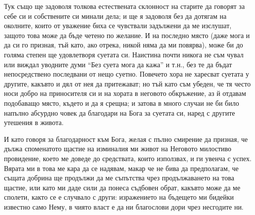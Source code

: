 \documentclass[12pt]{book}
\begin{document}
Тук също ще задоволя толкова естествената склонност на старите да говорят за себе си и собствените си минали дела; и ще я задоволя без да дотягам на околните, които от уважение биха се чувствали задължени да ме изслушат, защото това може да бъде четено по желание. И на последно място (даже мога и да си го призная, тъй като, ако отрека, никой няма да ми повярва), може би до голяма степен ще удовлетворя суетата си. Наистина почти никога не съм чувал или виждал уводните думи “Без суета мога да кажа” и т.н., без те да бъдат непосредствено последвани от нещо суетно. Повечето хора не харесват суетата у другите, какъвто и дял от нея да притежават; но тъй като съм убеден, че тя често носи добро на приносителя си и на хората в неговото обкръжение, аз й отдавам подобаващо място, където и да я срещна; и затова в много случаи не би било напълно абсурдно човек да благодари на Бога за суетата си, наред с другите утешения в живота.  

И като говоря за благодарност към Бога, желая с пълно смирение да призная, че дължа споменатото щастие на изминалия ми живот на Неговото милостиво провидение, което ме доведе до средствата, които използвах, и ги увенча с успех. Вярата ми в това ме кара да се надявам, макар че не бива да предполагам, че същата добрина ще продължи да ме съпътства чрез продължаването на това щастие, или като ми даде сили да понеса съдбовен обрат, какъвто може да ме сполети, както се е случвало с други: изражението на бъдещето ми бидейки известно само Нему, в чиято власт е да ни благослови дори чрез несгодите ни. 
\end{document}
